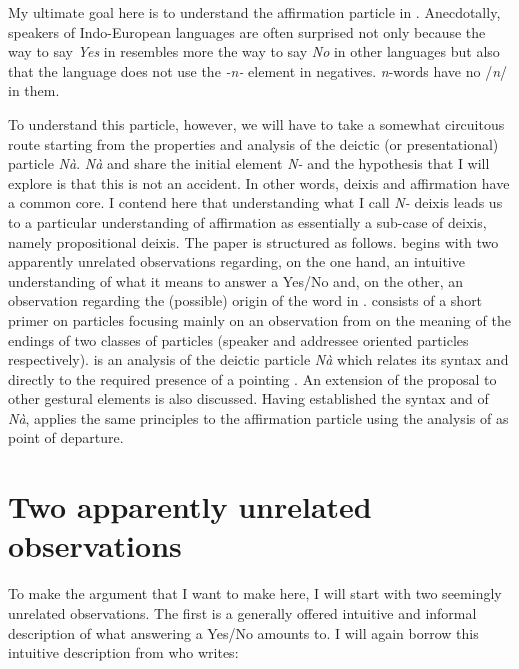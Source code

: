 \documentclass[output=paper]{LSP/langsci}
\begin{document}
My  ultimate goal here is to understand the affirmation particle \nai in .  Anecdotally, speakers of Indo-European languages are often surprised not only because the way to say \textit{Yes} in  resembles more the way to say \textit{No} in other languages but also that the language does not use the \textit{-n-} element in negatives.   \textit{n}-words have no /\textit{n}/ in them.

To understand this particle, however, we will have to take a somewhat circuitous route starting from the properties and analysis of the deictic (or presentational) particle \textit{N\`{a}}.  \textit{N\`{a}} and \nai share the initial element \textit{N-} and the hypothesis that I will explore is that this is not an accident.  In other words, deixis and affirmation have a common core.  I contend here that understanding what I call \textit{N-} deixis leads us to a particular understanding of affirmation as essentially a sub-case of deixis, namely propositional deixis.
The paper is structured as follows.   begins with two apparently unrelated observations regarding, on the one hand, an intuitive understanding of what it means to answer a Yes/No  and, on the other, an observation regarding the (possible) origin of the word \nai in .   consists of a short primer on  particles focusing mainly on an observation from \citet{tsoulas:15b} on the meaning of the endings of two classes of particles (speaker and addressee oriented particles respectively).
 is an analysis of the deictic  particle \textit{N\`{a}} which relates its syntax and  directly to the required presence of a pointing .  An extension of the proposal to other gestural elements is also discussed.
Having established the syntax and  of \textit{N\`{a}},  applies the same principles  to the affirmation particle \nai using the analysis of \citet{holmberg:15} as point of departure.


\section{Two apparently unrelated observations}
\label{sec2}
To make the argument that I want to make here, I will start with two seemingly unrelated observations.  The first is a generally offered intuitive and informal description of what answering a Yes/No  amounts to.  I will again {borrow} this intuitive description from \citet{holmberg:15} who writes:
\end{document}
